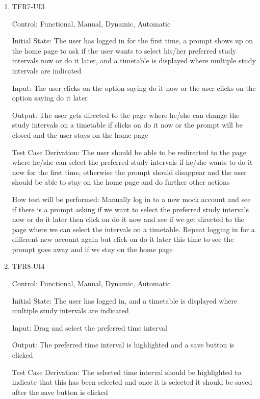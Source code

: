 \documentclass[12pt, titlepage]{article}
\begin{document}
\begin{enumerate}[resume]
  \item{TFR7-UI3\\}
  
  Control: Functional, Manual, Dynamic, Automatic
            
  Initial State: The user has logged in for the first time, a prompt shows up on the home page to ask if the user wants to select his/her preferred study intervals now or do it later, and a timetable is displayed where multiple study intervals are indicated
            
  Input: The user clicks on the option saying do it now or the user clicks on the option saying do it later
            
  Output: The user gets directed to the page where he/she can change the study intervals on a timetable if clicks on do it now or the prompt will be closed and the user stays on the home page
  
  Test Case Derivation: The user should be able to be redirected to the page where he/she can select the preferred study intervals if he/she wants to do it now for the first time, otherwise the prompt should disappear and the user should be able to stay on the home page and do further other actions
  
  How test will be performed: Manually log in to a new mock account and see if there is a prompt asking if we want to select the preferred study intervals now or do it later then click on do it now and see if we get directed to the page where we can select the intervals on a timetable. Repeat logging in for a different new account again but click on do it later this time to see the prompt goes away and if we stay on the home page
  
  \item{TFR8-UI4\\}
  
  Control: Functional, Manual, Dynamic, Automatic
            
  Initial State: The user has logged in, and a timetable is displayed where multiple study intervals are indicated
            
  Input: Drag and select the preferred time interval
            
  Output: The preferred time interval is highlighted and a save button is clicked
  
  Test Case Derivation: The selected time interval should be highlighted to indicate that this has been selected and once it is selected it should be saved after the save button is clicked
  

\end{enumerate}
\end{document}
